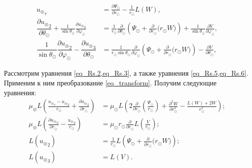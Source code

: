 \begin{align}
{u_\circledcirc}_r &= \frac{\partial \Psi_\odot}{\partial r_\odot} - \frac{1}{r_\odot}L(W),\label{eq_Rs.4}\\
\dfrac{\partial {u_\circledcirc}_2}{\partial\theta_\odot} + \frac1{\sin\theta_\odot}\frac{\partial {u_\circledcirc}_3}{\partial\varphi_\odot} &= \frac{1}{r_\odot}\frac{\partial}{\partial \theta_\odot} \left(\Psi_\odot + \frac{\partial}{\partial r_\odot}\biggl(r_\odot W\biggr)\right) + \frac{1}{\sin\theta_\odot}\frac{\partial V}{\partial\varphi_\odot},\label{eq_Rs.5}\\
\dfrac1{\sin\theta_\odot}\dfrac{\partial {u_\circledcirc}_2}{\partial\varphi_\odot} - \dfrac{\partial {u_\circledcirc}_3}{\partial\theta_\odot} &= \frac{1}{r_\odot \sin\theta_\odot}\frac{\partial}{\partial \varphi_\odot}\left(\Psi_\odot + \frac{\partial}{\partial r_\odot}\biggl(r_\odot W\biggr)\right) - \frac{\partial V}{\partial \theta_\odot},\label{eq_Rs.6}
\end{align}

Рассмотрим уравнения \cref{eq_Rs.2,eq_Rs.3}, а также уравнения \cref{eq_Rs.5,eq_Rs.6}. Применим к ним преобразование \cref{eq_transform}. Получим следующие уравнения:
\begin{align}
\mu_\circledcirc L\!\left(\frac{{u_\circledcirc}_r-{u_\circledcirc}_2}{r_\odot} + \frac{\partial {u_\circledcirc}_2}{\partial r_\odot}\right) &= \mu_\odot L\!\left(2\frac{\partial}{\partial r_\odot}\left(\frac{\Psi_\odot}{r_\odot}\right)+  \frac{\partial^2 W}{\partial r_\odot^2} - \frac{L(W) + 2W}{r_\odot^2} \right);\label{eq_Rs.2.2}\\
\mu_\circledcirc L\!\left(\frac{\partial {u_\circledcirc}_3}{\partial r_\odot} - \frac{{u_\circledcirc}_3}{r_\odot}\right) &= \mu_\odot r_\odot\frac{\partial}{\partial r_\odot}L\!\left(\frac{V}{r_\odot}\right);\label{eq_Rs.3.2}\\
L({u_\circledcirc}_2) &= \frac{1}{r_\odot}L\!\left(\Psi_\odot + \frac{\partial}{\partial r_\odot}\biggl(r_\odot W\biggr)\right);\label{eq_Rs.5.2}\\
L({u_\circledcirc}_3) &= L(V).\label{eq_Rs.6.2}
\end{align}

